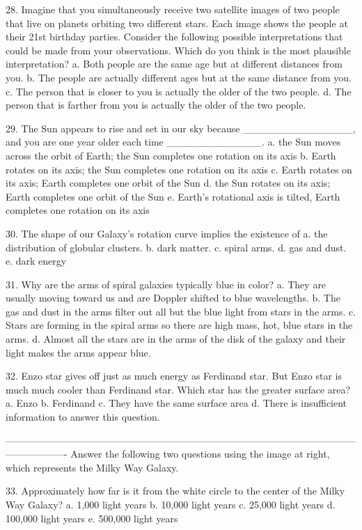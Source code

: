 28. Imagine that you simultaneously receive two satellite images of two people that live on planets orbiting two different stars. Each image shows the people at their 21st birthday parties. Consider the following possible interpretations that could be made from your observations. Which do you think is the most plausible interpretation? 
a. Both people are the same age but at different distances from you.
b. The people are actually different ages but at the same distance from you.
c. The person that is closer to you is actually the older of the two people.
d. The person that is farther from you is actually the older of the two people.


29. The Sun appears to rise and set in our sky because _______________, and you are one year older each time _____________.
a. the Sun moves across the orbit of Earth; the Sun completes one rotation on its axis
b. Earth rotates on its axis; the Sun completes one rotation on its axis
c. Earth rotates on its axis; Earth completes one orbit of the Sun
d. the Sun rotates on its axis; Earth completes one orbit of the Sun 
e. Earth’s rotational axis is tilted, Earth completes one rotation on its axis



30. The shape of our Galaxy’s rotation curve implies the existence of
a. the distribution of globular clusters.
b. dark matter.
c. spiral arms.
d. gas and dust.
e. dark energy


31. Why are the arms of spiral galaxies typically blue in color?
a. They are usually moving toward us and are Doppler shifted to blue wavelengths.
b. The gas and dust in the arms filter out all but the blue light from stars in the arms.
c. Stars are forming in the spiral arms so there are high mass, hot, blue stars in the arms.
d. Almost all the stars are in the arms of the disk of the galaxy and their light makes the arms appear blue.

32. Enzo star gives off just as much energy as Ferdinand star.  But Enzo star is much much cooler than Ferdinand star. Which star has the greater surface area?
a. Enzo
b. Ferdinand
c. They have the same surface area
d. There is insufficient information to answer this question.

-------------------------------------------------------------------------------------------------------------------------------
Answer the following two questions using the image at right, which represents the Milky Way Galaxy.  

33. Approximately how far is it from the white circle to the center of the Milky Way Galaxy? 
a. 1,000 light years
b. 10,000 light years
c. 25,000 light years
d. 100,000 light years
e. 500,000 light years

